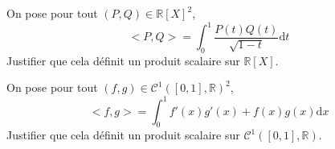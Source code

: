 \documentclass[a4paper,twoside,french,11pt]{VcCours}
\newcommand{\dt}{\text{d}t}
\newcommand{\dx}{\text{d}x}
\begin{document}
\begin{Exercice}{}\label{PS} On pose pour tout $(P,Q) \in \mathbb{R}[X]^2$,
$$ <P,Q> = \int_{0}^1 \dfrac{P(t)Q(t)}{\sqrt{1-t}} \dt $$
Justifier que cela définit un produit scalaire sur $\mathbb{R}[X]$.
\end{Exercice}

%
%
%
%


\begin{Exercice}{} \label{PS2} On pose pour tout $(f,g) \in \mathcal{C}^1([0,1],\mathbb{R})^2$,
$$ <f,g> = \int_{0}^1 f'(x)g'(x)+f(x)g(x) \dx$$
Justifier que cela définit un produit scalaire sur $\mathcal{C}^1([0,1],\mathbb{R})$.
\end{Exercice} 
\end{document}
